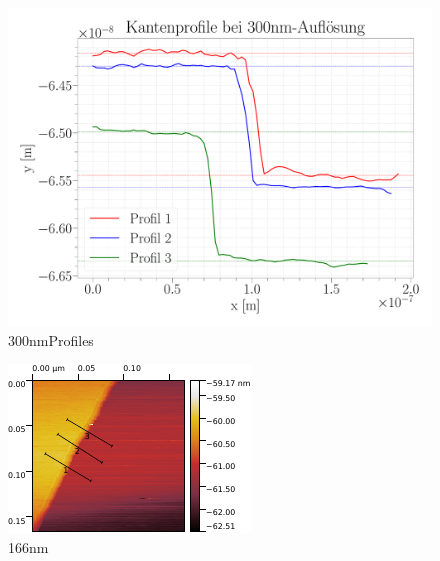 \begin{figure}[H]
\centering
\includegraphics[width=\textwidth]{../Figures/300nm_profiles.pdf}
\caption{300nmProfiles}
\label{300nmProfiles}
\end{figure}	

\begin{figure}[H]
\centering
\includegraphics[width=\textwidth]{../Gwyddion/HOPG/166nm.pdf}
\caption{166nm}
\label{166nm}
\end{figure}

